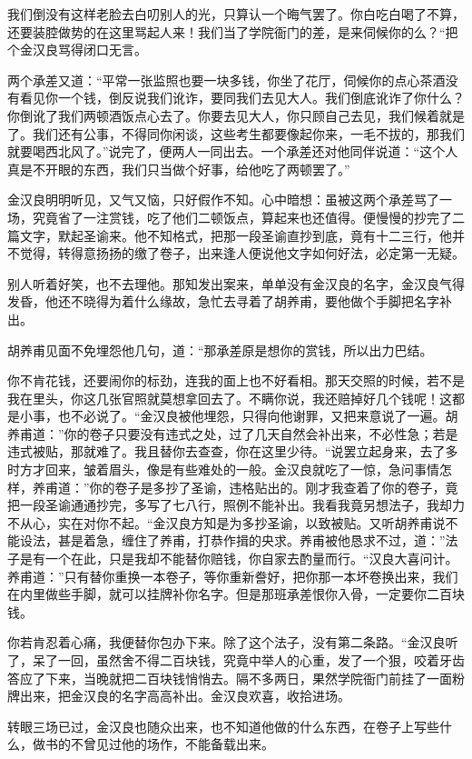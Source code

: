 \documentclass[12pt,UTF8]{ctexbook}
\begin{document}
{{{我们倒没有这样老脸去白叨别人的光，只算认一个晦气罢了。你白吃白喝了不算，还要装腔做势的在这里骂起人来！我们当了学院衙门的差，是来伺候你的么？“把个金汉良骂得闭口无言。

两个承差又道：“平常一张监照也要一块多钱，你坐了花厅，伺候你的点心茶酒没有看见你一个钱，倒反说我们讹诈，要同我们去见大人。我们倒底讹诈了你什么？你倒讹了我们两顿酒饭点心去了。你要去见大人，你只顾自己去见，我们候着就是了。我们还有公事，不得同你闲谈，这些考生都要像起你来，一毛不拔的，那我们就要喝西北风了。”说完了，便两人一同出去。一个承差还对他同伴说道：“这个人真是不开眼的东西，我们只当做个好事，给他吃了两顿罢了。”

金汉良明明听见，又气又恼，只好假作不知。心中暗想：虽被这两个承差骂了一场，究竟省了一注赏钱，吃了他们二顿饭点，算起来也还值得。便慢慢的抄完了二篇文字，默起圣谕来。他不知格式，把那一段圣谕直抄到底，竟有十二三行，他并不觉得，转得意扬扬的缴了卷子，出来逢人便说他文字如何好法，必定第一无疑。

别人听着好笑，也不去理他。那知发出案来，单单没有金汉良的名字，金汉良气得发昏，他还不晓得为着什么缘故，急忙去寻着了胡养甫，要他做个手脚把名字补出。

胡养甫见面不免埋怨他几句，道：“那承差原是想你的赏钱，所以出力巴结。

你不肯花钱，还要闹你的标劲，连我的面上也不好看相。那天交照的时候，若不是我在里头，你这几张官照就莫想拿回去了。不瞒你说，我还赔掉好几个钱呢！这都是小事，也不必说了。“金汉良被他埋怨，只得向他谢罪，又把来意说了一遍。胡养甫道：”你的卷子只要没有违式之处，过了几天自然会补出来，不必性急；若是违式被贴，那就难了。我且替你去查查，你在这里少待。“说罢立起身来，去了多时方才回来，皱着眉头，像是有些难处的一般。金汉良就吃了一惊，急问事情怎样，养甫道：”你的卷子是多抄了圣谕，违格贴出的。刚才我查着了你的卷子，竟把一段圣谕通通抄完，多写了七八行，照例不能补出。我看我竟另想法子，我却力不从心，实在对你不起。“金汉良方知是为多抄圣谕，以致被贴。又听胡养甫说不能设法，甚是着急，缠住了养甫，打恭作揖的央求。养甫被他恳求不过，道：”法子是有一个在此，只是我却不能替你赔钱，你自家去酌量而行。“汉良大喜问计。养甫道：”只有替你重换一本卷子，等你重新誊好，把你那一本坏卷换出来，我们在内里做些手脚，就可以挂牌补你名字。但是那班承差恨你入骨，一定要你二百块钱。

你若肯忍着心痛，我便替你包办下来。除了这个法子，没有第二条路。“金汉良听了，呆了一回，虽然舍不得二百块钱，究竟中举人的心重，发了一个狠，咬着牙齿答应了下来，当晚就把二百块钱悄悄去。隔不多两日，果然学院衙门前挂了一面粉牌出来，把金汉良的名字高高补出。金汉良欢喜，收拾进场。

转眼三场已过，金汉良也随众出来，也不知道他做的什么东西，在卷子上写些什么，做书的不曾见过他的场作，不能备载出来。

}}}
\end{document}

